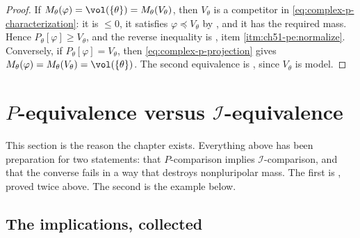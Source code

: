 \begin{proof}
If $M_\theta(\varphi)=\vol(\{\theta\})=M_\theta(V_\theta)$, then
$V_\theta$ is a competitor in
\eqref{eq:complex-p-characterization}: it is $\leq0$, it satisfies
$\varphi\preceq V_\theta$ by
, and it has the required mass.
Hence $P_\theta[\varphi]\geq V_\theta$, and the reverse inequality is
, item \cref{itm:ch51-pe:normalize}.
Conversely, if $P_\theta[\varphi]=V_\theta$, then
\eqref{eq:complex-p-projection} gives
$M_\theta(\varphi)=M_\theta(V_\theta)=\vol(\{\theta\})$.  The second
equivalence is , since
$V_\theta$ is model.
\end{proof}

\section{\texorpdfstring{$P$}{P}-equivalence versus
\texorpdfstring{$\mathcal I$}{I}-equivalence}
\label{sec:ch51-p-vs-i}

This section is the reason the chapter exists.  Everything above has been
preparation for two statements: that $P$-comparison implies
$\mathcal I$-comparison, and that the converse fails in a way that
destroys nonpluripolar mass.  The first is
, proved twice above.  The second
is the example below.

\subsection{The implications, collected}
\label{sec:ch51-implications}


